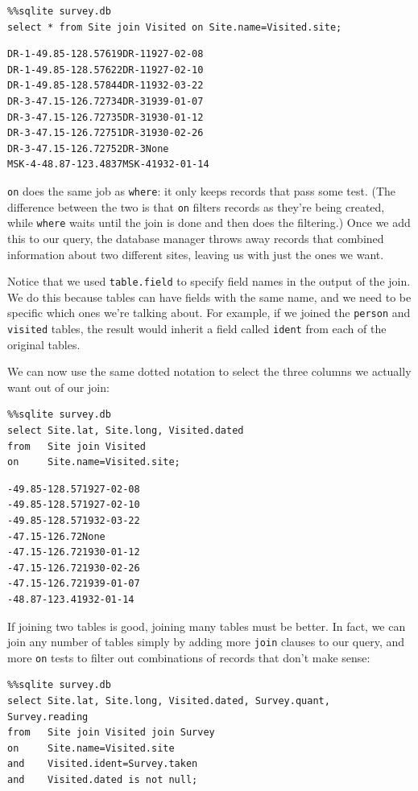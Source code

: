 \documentclass{book}
\begin{document}
\begin{verbatim}
%%sqlite survey.db
select * from Site join Visited on Site.name=Visited.site;
\end{verbatim}

\begin{verbatim}
DR-1-49.85-128.57619DR-11927-02-08
DR-1-49.85-128.57622DR-11927-02-10
DR-1-49.85-128.57844DR-11932-03-22
DR-3-47.15-126.72734DR-31939-01-07
DR-3-47.15-126.72735DR-31930-01-12
DR-3-47.15-126.72751DR-31930-02-26
DR-3-47.15-126.72752DR-3None
MSK-4-48.87-123.4837MSK-41932-01-14
\end{verbatim}

\texttt{on} does the same job as \texttt{where}: it only keeps records
that pass some test. (The difference between the two is that \texttt{on}
filters records as they're being created, while \texttt{where} waits
until the join is done and then does the filtering.) Once we add this to
our query, the database manager throws away records that combined
information about two different sites, leaving us with just the ones we
want.

Notice that we used \texttt{table.field} to specify field names in the
output of the join. We do this because tables can have fields with the
same name, and we need to be specific which ones we're talking about.
For example, if we joined the \texttt{person} and \texttt{visited}
tables, the result would inherit a field called \texttt{ident} from each
of the original tables.

We can now use the same dotted notation to select the three columns we
actually want out of our join:

\begin{verbatim}
%%sqlite survey.db
select Site.lat, Site.long, Visited.dated
from   Site join Visited
on     Site.name=Visited.site;
\end{verbatim}

\begin{verbatim}
-49.85-128.571927-02-08
-49.85-128.571927-02-10
-49.85-128.571932-03-22
-47.15-126.72None
-47.15-126.721930-01-12
-47.15-126.721930-02-26
-47.15-126.721939-01-07
-48.87-123.41932-01-14
\end{verbatim}

If joining two tables is good, joining many tables must be better. In
fact, we can join any number of tables simply by adding more
\texttt{join} clauses to our query, and more \texttt{on} tests to filter
out combinations of records that don't make sense:

\begin{verbatim}
%%sqlite survey.db
select Site.lat, Site.long, Visited.dated, Survey.quant, Survey.reading
from   Site join Visited join Survey
on     Site.name=Visited.site
and    Visited.ident=Survey.taken
and    Visited.dated is not null;
\end{verbatim}
\end{document}
